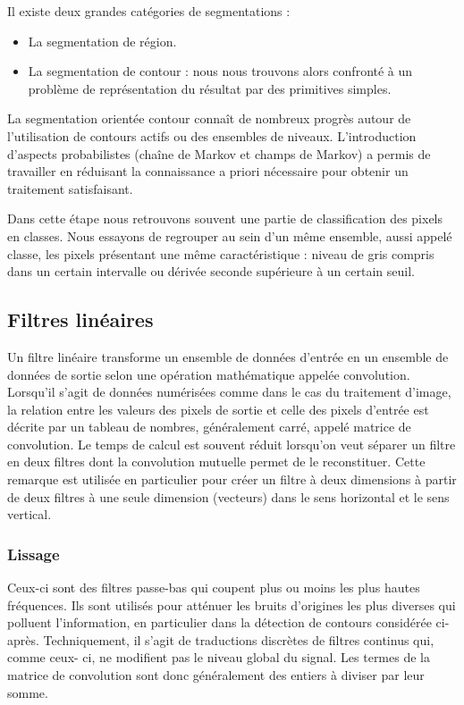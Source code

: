 \documentclass[11pt]{report}
\begin{document}
Il existe deux grandes catégories de segmentations :

\begin{itemize}
\item La segmentation de région.
\item  La segmentation de contour : nous nous trouvons alors  confronté à un problème de
représentation du résultat par des primitives simples.
\end{itemize}
La segmentation orientée contour connaît de nombreux progrès autour de
l'utilisation de contours actifs ou des ensembles de niveaux. L'introduction d'aspects
probabilistes (chaîne de Markov et champs de Markov) a permis de travailler en réduisant la
connaissance a priori nécessaire pour obtenir un traitement satisfaisant.


Dans cette étape nous retrouvons souvent une partie de classification des pixels en
classes. Nous essayons de regrouper au sein d'un même ensemble, aussi appelé classe, les
pixels présentant une même caractéristique : niveau de gris compris dans un certain
intervalle ou dérivée seconde supérieure à un certain seuil.
\subsection{Filtres linéaires}
Un filtre linéaire transforme un ensemble de données d'entrée en un ensemble de
données de sortie selon une opération mathématique appelée convolution. Lorsqu'il s'agit
de données numérisées comme dans le cas du traitement d'image, la relation entre les
valeurs des pixels de sortie et celle des pixels d'entrée est décrite par un tableau de
nombres, généralement carré, appelé matrice de convolution. Le temps de calcul est
souvent réduit lorsqu'on veut séparer un filtre en deux filtres dont la convolution mutuelle
permet de le reconstituer. Cette remarque est utilisée en particulier pour créer un filtre à
deux dimensions à partir de deux filtres à une seule dimension (vecteurs) dans le sens
horizontal et le sens vertical.

\subsubsection{Lissage}
Ceux-ci sont des filtres passe-bas qui coupent plus ou moins les plus hautes
fréquences. Ils sont utilisés pour atténuer les bruits d'origines les plus diverses qui polluent
l'information, en particulier dans la détection de contours considérée ci-après.
Techniquement, il s'agit de traductions discrètes de filtres continus qui, comme ceux-
ci, ne modifient pas le niveau global du signal. Les termes de la matrice de convolution sont
donc généralement des entiers à diviser par leur somme.
\end{document}
